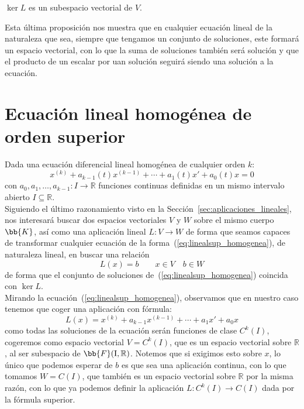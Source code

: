 \begin{prop}
    $\ker L$ es un subespacio vectorial de $V$.
\end{prop}
Esta última proposición nos muestra que en cualquier ecuación lineal de la naturaleza que sea, siempre que tengamos un conjunto de soluciones, este formará un espacio vectorial, con lo que la suma de soluciones también será solución y que el producto de un escalar por uan solución seguirá siendo una solución a la ecuación.

\section{Ecuación lineal homogénea de orden superior}
\noindent
Dada una ecuación diferencial lineal homogénea de cualquier orden $k$:
\begin{equation}\label{eq:linealsup_homogenea}
    x^{(k)} + a_{k-1}(t) x^{(k-1)} + \cdots + a_1(t)x' + a_0(t) x = 0
\end{equation}
con $a_0,a_1,\ldots,a_{k-1}:I\rightarrow\mathbb{R}$ funciones continuas definidas en un mismo intervalo abierto $I\subseteq \mathbb{R}$.\\

Siguiendo el último razonamiento visto en la Sección~\ref{sec:aplicaciones_lineales}, nos interesará buscar dos espacios vectoriales $V$ y $W$ sobre el mismo cuerpo $\bb{K}$, así como una aplicación lineal $L:V\rightarrow W$ de forma que seamos capaces de transformar cualquier ecuación de la forma~(\ref{eq:linealsup_homogenea}), de naturaleza lineal, en buscar una relación
\begin{equation*}
    L(x) = b \qquad x\in V \quad b\in W
\end{equation*}
de forma que el conjunto de soluciones de~(\ref{eq:linealsup_homogenea}) coincida con $\ker L$.\\

Mirando la ecuación~(\ref{eq:linealsup_homogenea}), observamos que en nuestro caso tenemos que coger una aplicación con fórmula:
\begin{equation*}
    L(x) = x^{(k)} + a_{k-1} x^{(k-1)} + \cdots + a_1x' + a_0 x 
\end{equation*}
como todas las soluciones de la ecuación serán funciones de clase $C^k(I)$, cogeremos como espacio vectorial $V=C^k(I)$, que es un espacio vectorial sobre $\mathbb{R}$, al ser subespacio de $\bb{F}(\text{I},\mathbb{R})$. Notemos que si exigimos esto sobre $x$, lo único que podemos esperar de $b$ es que sea una aplicación continua, con lo que tomamos $W = C(I)$, que también es un espacio vectorial sobre $\mathbb{R}$ por la misma razón, con lo que ya podemos definir la aplicación $L:C^k(I)\rightarrow C(I)$ dada por la fórmula superior.

